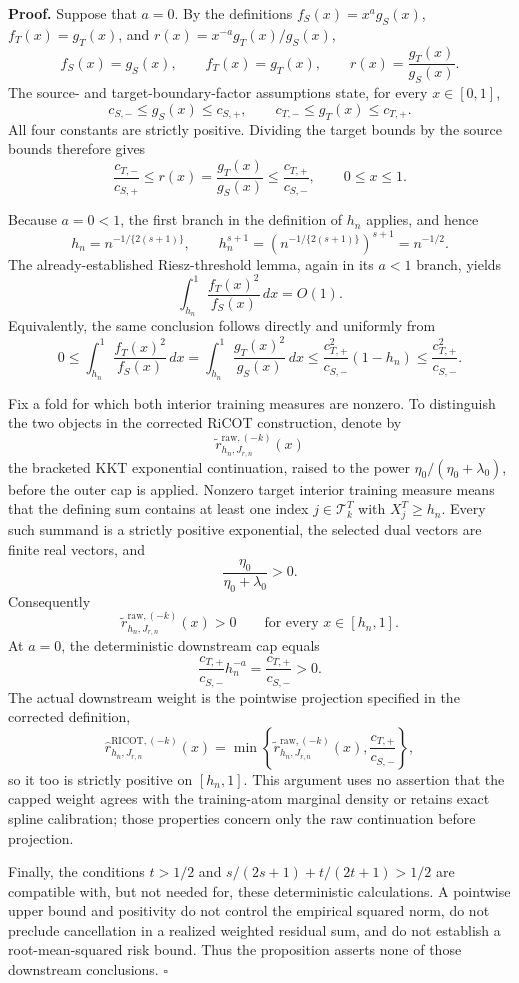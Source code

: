 \textbf{Proof.}
Suppose that \(a=0\).  By the definitions \(f_S(x)=x^a g_S(x)\), \(f_T(x)=g_T(x)\), and \(r(x)=x^{-a}g_T(x)/g_S(x)\),
\[
 f_S(x)=g_S(x),\qquad f_T(x)=g_T(x),\qquad
 r(x)=\frac{g_T(x)}{g_S(x)}.
\]
The source- and target-boundary-factor assumptions state, for every \(x\in[0,1]\),
\[
 c_{S,-}\le g_S(x)\le c_{S,+},
 \qquad
 c_{T,-}\le g_T(x)\le c_{T,+}.
\]
All four constants are strictly positive.  Dividing the target bounds by the source bounds therefore gives
\[
 \frac{c_{T,-}}{c_{S,+}}
 \le r(x)=\frac{g_T(x)}{g_S(x)}
 \le \frac{c_{T,+}}{c_{S,-}},
 \qquad 0\le x\le1.
\]

Because \(a=0<1\), the first branch in the definition of \(h_n\) applies, and hence
\[
 h_n=n^{-1/\{2(s+1)\}},
 \qquad
 h_n^{s+1}
 =\left(n^{-1/\{2(s+1)\}}\right)^{s+1}
 =n^{-1/2}.
\]
The already-established Riesz-threshold lemma, again in its \(a<1\) branch, yields
\[
 \int_{h_n}^1\frac{f_T(x)^2}{f_S(x)}\,dx=O(1).
\]
Equivalently, the same conclusion follows directly and uniformly from
\[
 0\le \int_{h_n}^1\frac{f_T(x)^2}{f_S(x)}\,dx
 =\int_{h_n}^1\frac{g_T(x)^2}{g_S(x)}\,dx
 \le \frac{c_{T,+}^2}{c_{S,-}}(1-h_n)
 \le \frac{c_{T,+}^2}{c_{S,-}}.
\]

Fix a fold for which both interior training measures are nonzero.  To distinguish the two objects in the corrected RiCOT construction, denote by
\[
 \widetilde r^{\mathrm{raw},(-k)}_{h_n,J_{r,n}}(x)
\]
the bracketed KKT exponential continuation, raised to the power \(\eta_0/(\eta_0+\lambda_0)\), before the outer cap is applied.  Nonzero target interior training measure means that the defining sum contains at least one index \(j\in\mathcal T^T_k\) with \(X_j^T\ge h_n\).  Every such summand is a strictly positive exponential, the selected dual vectors are finite real vectors, and
\[
 \frac{\eta_0}{\eta_0+\lambda_0}>0.
\]
Consequently
\[
 \widetilde r^{\mathrm{raw},(-k)}_{h_n,J_{r,n}}(x)>0
 \qquad\text{for every }x\in[h_n,1].
\]
At \(a=0\), the deterministic downstream cap equals
\[
 \frac{c_{T,+}}{c_{S,-}}h_n^{-a}
 =\frac{c_{T,+}}{c_{S,-}}>0.
\]
The actual downstream weight is the pointwise projection specified in the corrected definition,
\[
 \widehat r^{\mathrm{RICOT},(-k)}_{h_n,J_{r,n}}(x)
 =\min\left\{
 \widetilde r^{\mathrm{raw},(-k)}_{h_n,J_{r,n}}(x),
 \frac{c_{T,+}}{c_{S,-}}
 \right\},
\]
so it too is strictly positive on \([h_n,1]\).  This argument uses no assertion that the capped weight agrees with the training-atom marginal density or retains exact spline calibration; those properties concern only the raw continuation before projection.

Finally, the conditions \(t>1/2\) and \(s/(2s+1)+t/(2t+1)>1/2\) are compatible with, but not needed for, these deterministic calculations.  A pointwise upper bound and positivity do not control the empirical squared norm, do not preclude cancellation in a realized weighted residual sum, and do not establish a root-mean-squared risk bound.  Thus the proposition asserts none of those downstream conclusions. \(\square\)